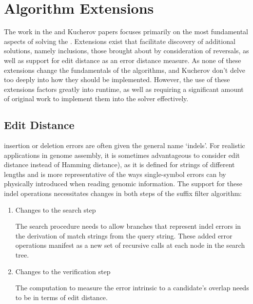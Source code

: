 
\section{Algorithm Extensions}
\label{extensions}

The work in the \vali{} and Kucherov papers focuses primarily on the most fundamental aspects of solving the \aspop{}. Extensions exist that facilitate discovery of additional \glspl{solution}, namely \glspl{inclusion}, those brought about by consideration of \glspl{reversal}, as well as support for \gls{edit distance} as an \gls{error distance} measure. As none of these extensions change the fundamentals of the algorithms, \vali{} and Kucherov don't delve too deeply into how they should be implemented. However, the use of these extensions factors greatly into runtime, as well as requiring a significant amount of original work to implement them into the \aspop{} solver effectively.



\subsection{Edit Distance}
\label{editdistance}

\Gls{insertion} or \gls{deletion} \glspl{error} are often given the general name `\glspl{indel}'. For realistic applications in genome assembly, it is sometimes advantageous to consider \gls{edit distance}  instead of \gls{Hamming distance}), as it is defined for strings of different lengths and is more representative of the ways single-symbol errors can by physically introduced when reading genomic information. The support for these indel operations necessitates changes in both steps of the \gls{suffix filter} algorithm:

\begin{enumerate}
\item Changes to the \gls{search step}

The search procedure needs to allow branches that represent indel errors in the \gls{derivation} of match strings from the \gls{query} string. These added error operations manifest as a new set of recursive calls at each node in the search tree.

\item Changes to the \gls{verification step}

The computation to measure the error intrinsic to a \gls{candidate}’s overlap needs to be in terms of edit distance.
\end{enumerate}


